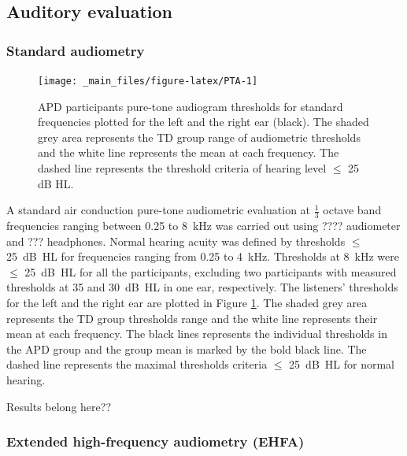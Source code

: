 \documentclass[a4paper, twoside]{templates/ociamthesis}
\begin{document}
\hypertarget{auditory-evaluation}{%
\subsection{Auditory evaluation}\label{auditory-evaluation}}

\hypertarget{standard-audiometry}{%
\subsubsection{\texorpdfstring{\textbf{Standard audiometry}}{Standard audiometry}}\label{standard-audiometry}}

\begin{figure}

{\centering \texttt{[image: \_main\_files/figure-latex/PTA-1]} 

}

\caption{APD participants pure-tone audiogram thresholds for standard frequencies plotted for the left and the right ear (black). The shaded grey area represents the TD group range of audiometric thresholds and the white line represents the mean at each frequency. The dashed line represents the threshold criteria of hearing level $\leq$ 25 dB HL.}\label{fig:PTA}
\end{figure}

A standard air conduction pure-tone audiometric evaluation at \(\frac{1}{3}\) octave band frequencies ranging between 0.25 to 8~kHz was carried out using ???? audiometer and ??? headphones. Normal hearing acuity was defined by thresholds \(\leq\) 25~dB~HL for frequencies ranging from 0.25 to 4~kHz. Thresholds at 8~kHz were \(\leq\) 25~dB~HL for all the participants, excluding two participants with measured thresholds at 35 and 30~dB~HL in one ear, respectively. The listeners' thresholds for the left and the right ear are plotted in Figure \ref{fig:PTA}. The shaded grey area represents the TD group thresholds range and the white line represents their mean at each frequency. The black lines represents the individual thresholds in the APD group and the group mean is marked by the bold black line. The dashed line represents the maximal thresholds criteria \(\leq\) 25~dB~HL for normal hearing.

\colorbox[HTML]{CCCCFF}{Results belong here??}

\hypertarget{extended-high-frequency-audiometry-ehfa}{%
\subsubsection{Extended high-frequency audiometry (EHFA)}\label{extended-high-frequency-audiometry-ehfa}}
\end{document}
